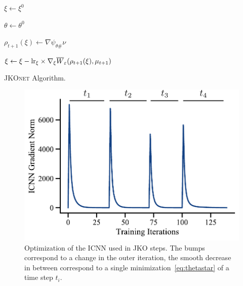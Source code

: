 \begin{algorithm}[t]
$\xi\leftarrow \xi^0$

 {
 {

  $\theta\leftarrow \theta^0$

  $\rho_{t+1}(\xi) \leftarrow \nabla \psi_{\theta \#} \nu$

  $\xi \leftarrow \xi - \text{lr}_\xi \times \nabla_\xi \overline{W}_{\varepsilon}(\rho_{t+1}(\xi), \mu_{t+1})$
}
}

\caption{\textsc{JKOnet} Algorithm.}
\label{algo:jkonet}
\end{algorithm}

\begin{figure}
    \centering
    \includegraphics[width=\textwidth]{figures/fig_optimization_icnn.pdf}
    \caption{Optimization of the ICNN used in JKO steps. The bumps correspond to a change in the outer iteration, the smooth decrease in between correspond to a single minimization~\eqref{eq:thetastar} of a time step $t_i$. }
    \label{fig:training_icnn}
\end{figure}

